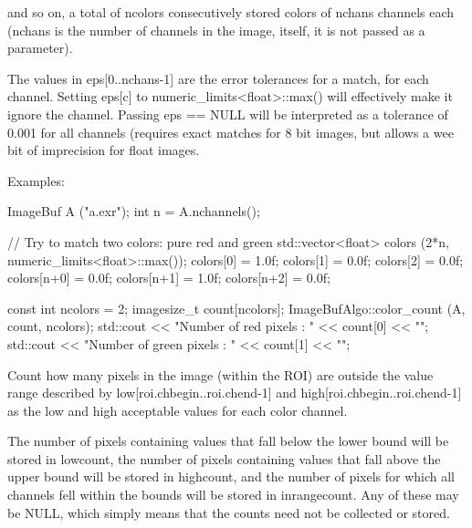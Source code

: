 \noindent and so on, a total of {\cf ncolors} consecutively stored
colors of {\cf nchans} channels each ({\cf nchans} is the number of
channels in the image, itself, it is not passed as a parameter).


The values in {\cf eps[0..nchans-1]} are the error tolerances for a
match, for each channel.  Setting {\cf eps[c]} to 
{\cf numeric_limits<float>::max()} will effectively make it ignore the
channel.  Passing {\cf eps == NULL} will be interpreted as a tolerance
of 0.001 for all channels (requires exact matches for 8 bit images, but
allows a wee bit of imprecision for {\cf float} images.

\smallskip
\noindent Examples:
\begin{code}
    ImageBuf A ("a.exr");
    int n = A.nchannels();

    // Try to match two colors: pure red and green
    std::vector<float> colors (2*n, numeric_limits<float>::max());
    colors[0] = 1.0f; colors[1] = 0.0f; colors[2] = 0.0f;
    colors[n+0] = 0.0f; colors[n+1] = 1.0f; colors[n+2] = 0.0f;

    const int ncolors = 2;
    imagesize_t count[ncolors];
    ImageBufAlgo::color_count (A, count, ncolors);
    std::cout << "Number of red pixels   : " << count[0] << "\n";
    std::cout << "Number of green pixels : " << count[1] << "\n";
\end{code}
\apiend


 

Count how many pixels in the image (within the ROI) are outside the
value range described by {\cf low[roi.chbegin..roi.chend-1]} and
{\cf high[roi.chbegin..roi.chend-1]} 
as the low and high acceptable values for each color channel.  

The number of pixels containing values that fall below the lower bound
will be stored in {\cf *lowcount}, the number of pixels containing
values that fall above the upper bound will be stored in 
{\cf *highcount}, and the number of pixels for which all channels fell
within the bounds will be stored in {\cf *inrangecount}.  Any of these
may be NULL, which simply means that the counts need not be collected or
stored.

